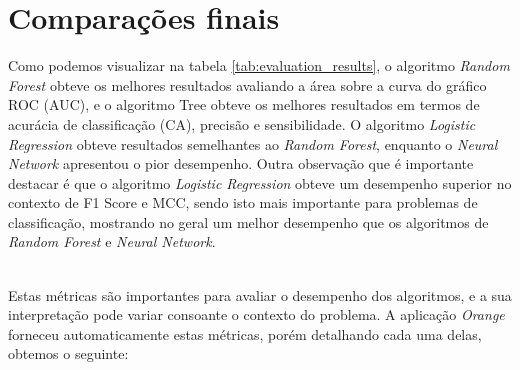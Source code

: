 \documentclass[conference]{IEEEtran}
\begin{document}
\section{Comparações finais}
Como podemos visualizar na tabela \ref{tab:evaluation_results}, o algoritmo \textit{Random Forest} obteve os melhores resultados avaliando a área sobre
a curva do gráfico ROC (AUC), e o algoritmo Tree obteve os melhores resultados em termos de acurácia de classificação (CA), precisão e sensibilidade.
O algoritmo \textit{Logistic Regression} obteve resultados semelhantes ao \textit{Random Forest}, enquanto o \textit{Neural Network} apresentou o pior desempenho.
Outra observação que é importante destacar é que o algoritmo \textit{Logistic Regression} obteve um desempenho superior no contexto de F1 Score e MCC, sendo isto mais
importante para problemas de classificação, mostrando no geral um melhor desempenho que os algoritmos de \textit{Random Forest} e \textit{Neural Network}.
\begin{table}[!ht]
	\centering
	\caption{Comparação de Resultados dos Algoritmos}
	\label{tab:evaluation_results}

\end{table}
\\

Estas métricas são importantes para avaliar o desempenho dos algoritmos, e a sua interpretação pode variar consoante o contexto do problema.
A aplicação \textit{Orange} forneceu automaticamente estas métricas, porém detalhando cada uma delas, obtemos o seguinte:
\end{document}
